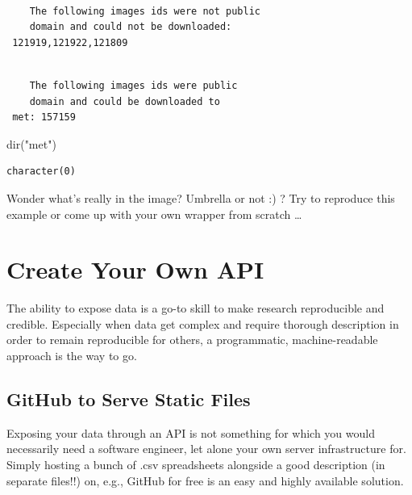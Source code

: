 \documentclass[
  12pt,
  letterpaper,
]{krantz}
\newenvironment{Shaded}{\begin{snugshade}}{\end{snugshade}}
\newcommand{\FunctionTok}[1]{\textcolor[rgb]{0.28,0.35,0.67}{#1}}
\newcommand{\NormalTok}[1]{\textcolor[rgb]{0.00,0.23,0.31}{#1}}
\newcommand{\StringTok}[1]{\textcolor[rgb]{0.13,0.47,0.30}{#1}}
\begin{document}
\begin{verbatim}

    The following images ids were not public
    domain and could not be downloaded:
 121919,121922,121809
\end{verbatim}

\begin{verbatim}

    The following images ids were public
    domain and could be downloaded to
 met: 157159
\end{verbatim}

\begin{Shaded}
\begin{Highlighting}[]
\FunctionTok{dir}\NormalTok{(}\StringTok{"met"}\NormalTok{)}
\end{Highlighting}
\end{Shaded}

\begin{verbatim}
character(0)
\end{verbatim}

Wonder what's really in the image? Umbrella or not :) ? Try to reproduce
this example or come up with your own wrapper from scratch \ldots{}

\hypertarget{create-your-own-api}{%
\section{\texorpdfstring{Create Your Own
API}{Create Your Own API}}\label{create-your-own-api}}

The ability to expose data is a go-to skill to make research
reproducible and credible. Especially when data get complex and require
thorough description in order to remain reproducible for others, a
programmatic, machine-readable approach is the way to go.

\hypertarget{github-to-serve-static-files}{%
\subsection{\texorpdfstring{GitHub to Serve Static
Files}{GitHub to Serve Static Files}}\label{github-to-serve-static-files}}

Exposing your data through an API is not something for which you would
necessarily need a software engineer, let alone your own server
infrastructure for. Simply hosting a bunch of .csv
spreadsheets alongside a good description (in separate files!!) on,
e.g., GitHub for free is an easy and highly available
solution.
\end{document}
